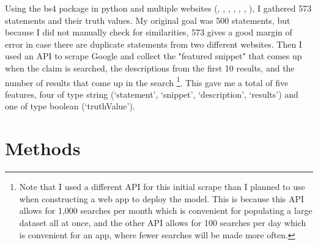 \documentclass[]{article}
\begin{document}
			
		Using the bs4 package in python and multiple websites (\cite{tf1}, \cite{tf2}, \cite{tf3}, \cite{tf4}, \cite{tf5}, \cite{tf6}, \cite{tf7}), I gathered 573 statements and their truth values. My original goal was 500 statements, but because I did not manually check for similarities, 573 gives a good margin of error in case there are duplicate statements from two different websites. Then I used an API to scrape Google and collect the "featured snippet" that comes up when the claim is searched, the descriptions from the first 10 results, and the number of results that come up in the search \cite{a_api}
		\footnote{Note that I used a different API for this initial scrape than I planned to use when constructing a web app to deploy the model. This is because this API allows for 1,000 searches per month which is convenient for populating a large dataset all at once, and the other API allows for 100 searches per day which is convenient for an app, where fewer searches will be made more often.}. 
		This gave me a total of five features, four of type string (`statement', `snippet', `description', `results') and one of type boolean (`truthValue').
		
	\section{Methods}
		
		
		
		
\end{document}
